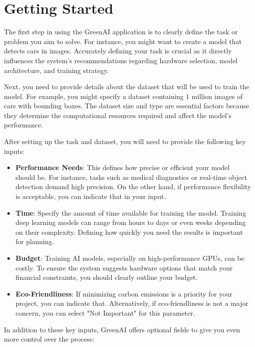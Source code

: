 \documentclass{report}
\begin{document}
\chapter{Getting Started}


The first step in using the GreenAI application is to clearly define the task or problem you aim to solve. For instance, you might want to create a model that detects cars in images. Accurately defining your task is crucial as it directly influences the system's recommendations regarding hardware selection, model architecture, and training strategy.

Next, you need to provide details about the dataset that will be used to train the model. For example, you might specify a dataset containing 1 million images of cars with bounding boxes. The dataset size and type are essential factors because they determine the computational resources required and affect the model's performance.

After setting up the task and dataset, you will need to provide the following key inputs:

\begin{itemize}
    \item \textbf{Performance Needs}: This defines how precise or efficient your model should be. For instance, tasks such as medical diagnostics or real-time object detection demand high precision. On the other hand, if performance flexibility is acceptable, you can indicate that in your input.
    \item \textbf{Time}: Specify the amount of time available for training the model. Training deep learning models can range from hours to days or even weeks depending on their complexity. Defining how quickly you need the results is important for planning.
    \item \textbf{Budget}: Training AI models, especially on high-performance GPUs, can be costly. To ensure the system suggests hardware options that match your financial constraints, you should clearly outline your budget.
    \item \textbf{Eco-Friendliness}: If minimizing carbon emissions is a priority for your project, you can indicate that. Alternatively, if eco-friendliness is not a major concern, you can select "Not Important" for this parameter.
\end{itemize}

In addition to these key inputs, GreenAI offers optional fields to give you even more control over the process:
\end{document}
